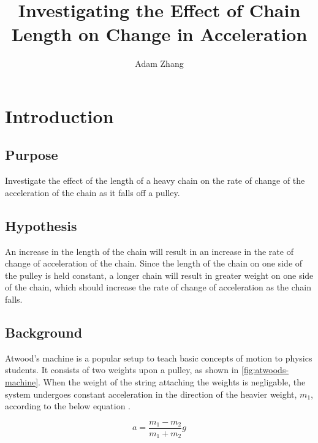 \documentclass[stu,biblatex,floatsintext]{apa7}
\title{Investigating the Effect of Chain Length on Change in Acceleration}
\author{Adam Zhang}
\affiliation{Academies of Loudoun}
\begin{document}
\maketitle
\tableofcontents
\newpage

\section{Introduction}

\subsection{Purpose}
Investigate the effect of the length of a heavy chain on the rate of change of the acceleration of the chain as it falls off a pulley.

\subsection{Hypothesis}\label{sec:hypothesis}
An increase in the length of the chain will result in an increase in the rate of change of acceleration of the chain. Since the length of the chain on one side of the pulley is held constant, a longer chain will result in greater weight on one side of the chain, which should increase the rate of change of acceleration as the chain falls.

\subsection{Background}
Atwood's machine is a popular setup to teach basic concepts of motion to physics students. It consists of two weights upon a pulley, as shown in \autoref{fig:atwoods-machine}. When the weight of the string attaching the weights is negligable, the system undergoes constant acceleration in the direction of the heavier weight, $m_1$, according to the below equation \parencite{Zeleny2011AtwoodsMachine}.

\begin{displaymath}
	a = \frac{m_1 - m_2}{m_1 + m_2}g
\end{displaymath}
\end{document}
